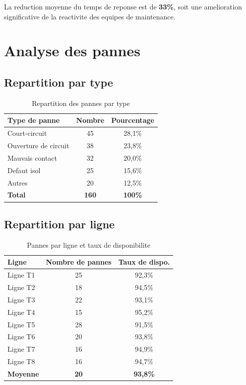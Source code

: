 La reduction moyenne du temps de reponse est de \textbf{33\%}, soit une amelioration significative de la reactivite des equipes de maintenance.

\section{Analyse des pannes}

\subsection{Repartition par type}

\begin{table}[htbp]
\centering
\renewcommand{\arraystretch}{1.3}
\begin{tabular}{l c c}
\toprule
\textbf{Type de panne} & \textbf{Nombre} & \textbf{Pourcentage} \\
\midrule
Court-circuit & 45 & 28,1\% \\
Ouverture de circuit & 38 & 23,8\% \\
Mauvais contact & 32 & 20,0\% \\
Defaut isol & 25 & 15,6\% \\
Autres & 20 & 12,5\% \\
\midrule
\textbf{Total} & \textbf{160} & \textbf{100\%} \\
\bottomrule
\end{tabular}
\caption{Repartition des pannes par type}
\label{tab:repartition_types}
\end{table}

\subsection{Repartition par ligne}

\begin{table}[htbp]
\centering
\renewcommand{\arraystretch}{1.3}
\begin{tabular}{l c c}
\toprule
\textbf{Ligne} & \textbf{Nombre de pannes} & \textbf{Taux de dispo.} \\
\midrule
Ligne T1 & 25 & 92,3\% \\
Ligne T2 & 18 & 94,5\% \\
Ligne T3 & 22 & 93,1\% \\
Ligne T4 & 15 & 95,2\% \\
Ligne T5 & 28 & 91,5\% \\
Ligne T6 & 20 & 93,8\% \\
Ligne T7 & 16 & 94,9\% \\
Ligne T8 & 16 & 94,7\% \\
\midrule
\textbf{Moyenne} & \textbf{20} & \textbf{93,8\%} \\
\bottomrule
\end{tabular}
\caption{Pannes par ligne et taux de disponibilite}
\label{tab:pannes_par_ligne}
\end{table}

